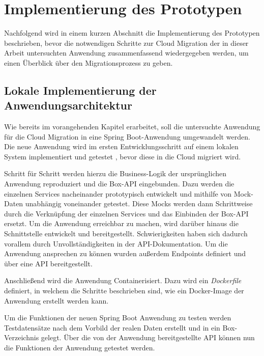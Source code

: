 \chapter{Implementierung des Prototypen}

Nachfolgend wird in einem kurzen Abschnitt die Implementierung des Prototypen beschrieben, bevor die notwendigen Schritte zur Cloud Migration der in dieser Arbeit untersuchten Anwendung zusammenfassend wiedergegeben werden, um einen Überblick über den Migrationsprozess zu geben.

\section{Lokale Implementierung der Anwendungsarchitektur}

Wie bereits im vorangehenden Kapitel erarbeitet, soll die untersuchte Anwendung für die Cloud Migration in eine \gls{Spring Boot}-Anwendung umgewandelt werden. Die neue Anwendung wird im ersten Entwicklungsschritt auf einem lokalen System implementiert und getestet , bevor diese in die Cloud migriert wird.

Schritt für Schritt werden hierzu die Business-Logik der ursprünglichen Anwendung reproduziert und die \gls{Box}-\ac{API} eingebunden. Dazu werden die einzelnen Services nacheinander prototypisch entwickelt und mithilfe von Mock-Daten unabhängig voneinander getestet. Diese Mocks werden dann Schrittweise durch die Verknüpfung der einzelnen Services und das Einbinden der \gls{Box}-\ac{API} ersetzt. Um die Anwendung erreichbar zu machen, wird darüber hinaus die Schnittstelle entwickelt und bereitgestellt. Schwierigkeiten haben sich dadurch vorallem durch Unvollständigkeiten in der \ac{API}-Dokumentation. Um die Anwendung ansprechen zu können wurden außerdem Endpoints definiert und über eine \ac{API} bereitgestellt.

Anschließend wird die Anwendung Containerisiert. Dazu wird ein \textit{Dockerfile} definiert, in welchem die Schritte beschrieben sind, wie ein Docker-Image der Anwendung erstellt werden kann.

Um die Funktionen der neuen \gls{Spring Boot} Anwendung zu testen werden Testdatensätze nach dem Vorbild der realen Daten erstellt und in ein \gls{Box}-Verzeichnis gelegt. Über die von der Anwendung bereitgestellte \ac{API} können nun die Funktionen der Anwendung getestet werden. \pagebreak

